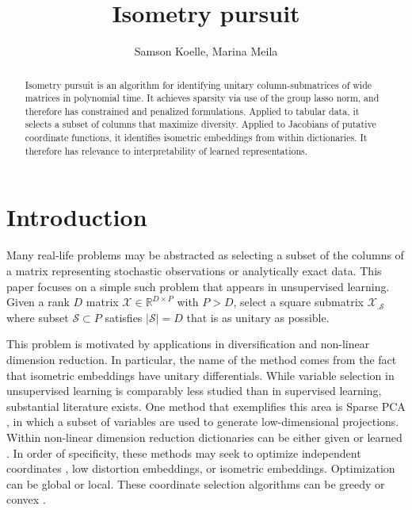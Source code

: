\documentclass[a4paper,11pt]{article}
\begin{document}
\title{Isometry pursuit}
\author{Samson Koelle, Marina Meila}

\maketitle

\begin{abstract}

Isometry pursuit is an algorithm for identifying unitary column-submatrices of wide matrices in polynomial time. %
It achieves sparsity via use of the group lasso norm, and therefore has constrained and penalized formulations.
Applied to tabular data, it selects a subset of columns that maximize diversity.
Applied to Jacobians of putative coordinate functions, it identifies isometric embeddings from within dictionaries.
It therefore has relevance to interpretability of learned representations.

\end{abstract}

\section{Introduction}
\label{sec:introduction}

Many real-life problems may be abstracted as selecting a subset of the columns of a matrix representing stochastic observations or analytically exact data.
This paper focuses on a simple such problem that appears in unsupervised learning.
Given a rank $D$ matrix $\mathcal X \in \mathbb R^{D \times P}$ with $P > D$, select a square submatrix $\mathcal X_{.\mathcal S}$ where subset $\mathcal S \subset P$ satisfies $|\mathcal S| = D$ that is as unitary as possible.

This problem is motivated by applications in diversification and non-linear dimension reduction.
In particular, the name of the method comes from the fact that isometric embeddings have unitary differentials.
While variable selection in unsupervised learning is comparably less studied than in supervised learning, substantial literature exists.
One method that exemplifies this area is Sparse PCA \cite{Dey2017-mx}, in which a subset of variables are used to generate low-dimensional projections.
Within non-linear dimension reduction dictionaries can be either given \cite{Koelle2022-ju, Koelle2024-no} or learned \cite{Kohli2021-lr}. 
In order of specificity, these methods may seek to optimize independent coordinates \cite{Chen2019-km, He2023-ch}, low distortion embeddings, or isometric embeddings.
Optimization can be global or local.
These coordinate selection algorithms can be greedy \cite{NEURIPS2019_6a10bbd4, Kohli2021-lr, Jones2007-uc} or convex \cite{Koelle2022-ju, Koelle2024-no}.
\end{document}
